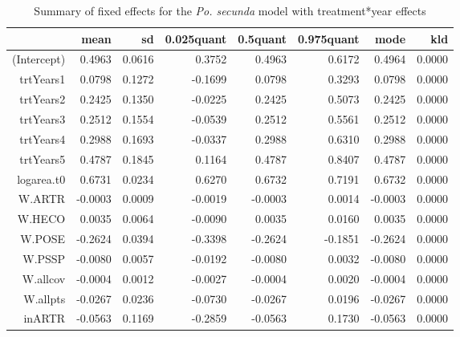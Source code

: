 \documentclass[11pt]{article}
\begin{document}
\begin{table}
\centering
\caption{Summary of fixed effects for the \textit{Po. secunda} model with treatment*year effects} 
\label{table:POSEgrowth-trtYears}
\begin{tabular}{rrrrrrrr}
  \hline
 & mean & sd & 0.025quant & 0.5quant & 0.975quant & mode & kld \\ 
  \hline
(Intercept) & 0.4963 & 0.0616 & 0.3752 & 0.4963 & 0.6172 & 0.4964 & 0.0000 \\ 
  trtYears1 & 0.0798 & 0.1272 & -0.1699 & 0.0798 & 0.3293 & 0.0798 & 0.0000 \\ 
  trtYears2 & 0.2425 & 0.1350 & -0.0225 & 0.2425 & 0.5073 & 0.2425 & 0.0000 \\ 
  trtYears3 & 0.2512 & 0.1554 & -0.0539 & 0.2512 & 0.5561 & 0.2512 & 0.0000 \\ 
  trtYears4 & 0.2988 & 0.1693 & -0.0337 & 0.2988 & 0.6310 & 0.2988 & 0.0000 \\ 
  trtYears5 & 0.4787 & 0.1845 & 0.1164 & 0.4787 & 0.8407 & 0.4787 & 0.0000 \\ 
  logarea.t0 & 0.6731 & 0.0234 & 0.6270 & 0.6732 & 0.7191 & 0.6732 & 0.0000 \\ 
  W.ARTR & -0.0003 & 0.0009 & -0.0019 & -0.0003 & 0.0014 & -0.0003 & 0.0000 \\ 
  W.HECO & 0.0035 & 0.0064 & -0.0090 & 0.0035 & 0.0160 & 0.0035 & 0.0000 \\ 
  W.POSE & -0.2624 & 0.0394 & -0.3398 & -0.2624 & -0.1851 & -0.2624 & 0.0000 \\ 
  W.PSSP & -0.0080 & 0.0057 & -0.0192 & -0.0080 & 0.0032 & -0.0080 & 0.0000 \\ 
  W.allcov & -0.0004 & 0.0012 & -0.0027 & -0.0004 & 0.0020 & -0.0004 & 0.0000 \\ 
  W.allpts & -0.0267 & 0.0236 & -0.0730 & -0.0267 & 0.0196 & -0.0267 & 0.0000 \\ 
  inARTR & -0.0563 & 0.1169 & -0.2859 & -0.0563 & 0.1730 & -0.0563 & 0.0000 \\ 
   \hline
\end{tabular}
\end{table}
\end{document}
